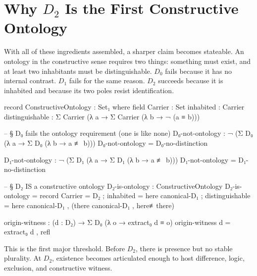 \documentclass[11pt,a4paper]{book}
\begin{document}
\section{Why $D_2$ Is the First Constructive Ontology}

With all of these ingredients assembled, a sharper claim becomes stateable. An ontology in the constructive sense requires two things: something must exist, and at least two inhabitants must be distinguishable. $D_0$ fails because it has no internal contrast. $D_1$ fails for the same reason. $D_2$ succeeds because it is inhabited and because its two poles resist identification.

\begin{code}

record ConstructiveOntology : Set₁ where
  field
    Carrier : Set
    inhabited : Carrier
    distinguishable : Σ Carrier (λ a → Σ Carrier (λ b → ¬ (a ≡ b)))

-- § D₀ fails the ontology requirement (one is like none)
D₀-not-ontology : ¬ (Σ D₀ (λ a → Σ D₀ (λ b → a ≢ b)))
D₀-not-ontology = D₀-no-distinction

D₁-not-ontology : ¬ (Σ D₁ (λ a → Σ D₁ (λ b → a ≢ b)))
D₁-not-ontology = D₁-no-distinction

-- § D₂ IS a constructive ontology
D₂-is-ontology : ConstructiveOntology
D₂-is-ontology = record
  { Carrier = D₂
  ; inhabited = here canonical-D₁
  ; distinguishable = here canonical-D₁ , (there canonical-D₁ , here≢there)
  }

origin-witness : (d : D₂) → Σ D₀ (λ o → extract₀ d ≡ o)
origin-witness d = extract₀ d , refl
\end{code}

This is the first major threshold. Before $D_2$, there is presence but no stable plurality. At $D_2$, existence becomes articulated enough to host difference, logic, exclusion, and constructive witness.
\end{document}
